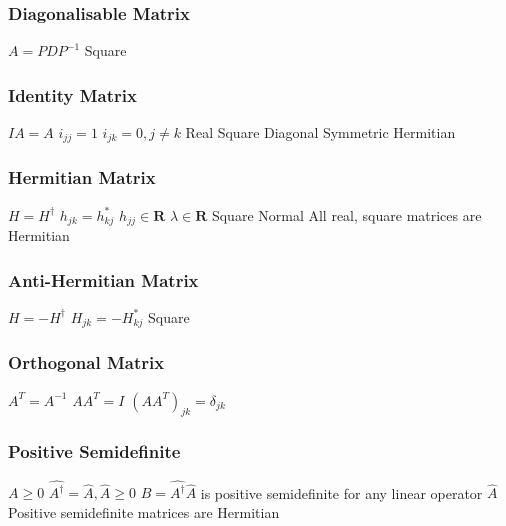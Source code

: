 \subsubsection{Diagonalisable Matrix}			
\begin{itemize}
\itemt \( A = PDP^{-1} \)
\itemt Square
\end{itemize}

\subsubsection{Identity Matrix}				
\begin{itemize}
\itemt \( IA = A \)
\itemt \( i_{jj} = 1 \)
\itemt \( i_{jk} = 0, j \neq k \)
\itemt Real
\itemt Square
\itemt Diagonal
\itemt Symmetric
\itemt Hermitian
\end{itemize}		

\subsubsection{Hermitian Matrix}			
\begin{itemize}
\itemt \( H = H^{\dagger} \)
\itemt \( h_{jk} = h^*_{kj} \)
\itemt \( h_{jj} \in \mathbf{R} \)
\itemt \( \lambda \in \mathbf{R} \)
\itemt Square
\itemt Normal
\itemt All real, square matrices are Hermitian
\end{itemize}

\subsubsection{Anti-Hermitian Matrix}			
\begin{itemize}
\itemt \( H = -H^{\dagger} \)
\itemt \( H_{jk} = -H^*_{kj} \)
\itemt Square
\end{itemize}

\subsubsection{Orthogonal Matrix}			
\begin{itemize}
\itemt \( A^T = A^{-1} \)
\itemt \( AA^T = I \)
\itemt \( (AA^T)_{jk} = \delta_{jk} \)
\end{itemize}			

\subsubsection{Positive Semidefinite}			
\begin{itemize}
\itemt \( A \geq 0 \)
\itemt \( \hat{A^\dagger} = \hat{A}, \hat{A} \geq 0 \)
\itemt \( B = \hat{A^\dagger} \hat{A} \) is positive semidefinite for any linear operator $\hat{A}$
\itemt Positive semidefinite matrices are Hermitian
\end{itemize}				

